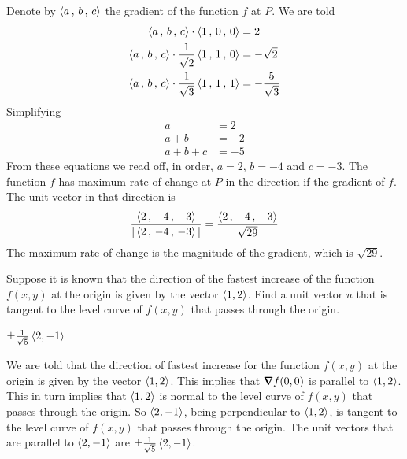 \begin{solution}
Denote by $\left< a\,,\,b\,,\,c\right>$ the gradient of the function $f$ at
$P$. We are told
\begin{align*}
\left< a\,,\,b\,,\,c\right> \cdot \left< 1\,,\,0\,,\,0\right> &= 2 \\
\left< a\,,\,b\,,\,c\right> \cdot \frac{1}{\sqrt{2}}\left< 1\,,\,1\,,\,0\right> &= -\sqrt{2} \\
\left< a\,,\,b\,,\,c\right> \cdot \frac{1}{\sqrt{3}}\left< 1\,,\,1\,,\,1\right> &= -\frac{5}{\sqrt{3}}
\end{align*}
Simplifying
\begin{align*}
a&=2 \\
a+b&=-2 \\
a+b+c&=-5
\end{align*}
From these equations we read off, in order,
$a=2$, $b=-4$ and $c=-3$.
The function $f$ has maximum rate of change at $P$ in the 
direction if the gradient of $f$. The unit vector in that direction is
\begin{equation*}
\frac{\left< 2\,,\,-4\,,\,-3\right>}{|\left< 2\,,\,-4\,,\,-3\right>|}
=\frac{\left< 2\,,\,-4\,,\,-3\right>}{\sqrt{29}}
\end{equation*}
The maximum rate of change is the magnitude of the gradient, which is
$\sqrt{29}$.
\end{solution}

\begin{question}[M200 2013D] %
Suppose it is known that the direction of the fastest increase of the 
function $f(x,y)$ at the origin is given by the vector $\left< 1, 2\right>$. 
Find a unit vector $u$ that is tangent to the level curve of $f(x,y)$ 
that passes through the origin.
\end{question}

%

\begin{answer}
$\pm\frac{1}{\sqrt{5}}\left< 2, -1\right>$
\end{answer}

\begin{solution}
We are told that the direction of fastest increase for the 
function $f(x,y)$ at the origin is given by the vector $\left< 1, 2\right>$.
This implies that $\vnabla f(0,0)$ is parallel to $\left< 1, 2\right>$.
This in turn implies that $\left< 1, 2\right>$ is normal to the level curve
of $f(x,y)$ that passes through the origin. So $\left< 2, -1\right>$, being 
perpendicular to $\left< 1, 2\right>$,  is tangent to the level curve of 
$f(x,y)$ that passes through the origin.
The unit vectors that are parallel to $\left< 2, -1\right>$
are $\pm\frac{1}{\sqrt{5}}\left< 2, -1\right>$.
\end{solution}

